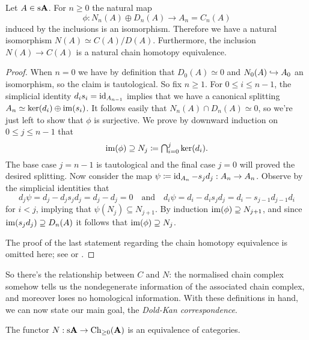 \begin{proposition}
  \label{splitting}
  Let $A \in \mathrm{s}\mathbf{A}$. For $n \ge 0$ the natural map
  \[
  \phi : N_n(A) \oplus D_n(A) \to A_n = C_n(A)
  \]
  induced by the inclusions is an isomorphism. Therefore we have a
  natural isomorphism $N(A) \simeq C(A)/D(A)$. Furthermore, the
  inclusion $N(A) \to C(A)$ is a natural chain homotopy equivalence.
\end{proposition}

\begin{proof}
  When $n=0$ we have by definition that $D_0(A) \simeq 0$ and $N_0(A)
  \hookrightarrow A_0$ an isomorphism, so the claim is tautological. So fix $n
  \ge 1$. For $0 \le i \le n - 1$, the simplicial identity $d_is_i =
  \operatorname{id}_{A_{n-1}}$ implies that we have a canonical splitting $A_n
  \simeq \ker(d_i) \oplus \operatorname{im}(s_i)$. It follows easily that $N_n(A)
  \cap D_n(A) \simeq 0$, so we're just left to show that $\phi$ is
  surjective. We prove by downward induction on $0 \le j \le n-1$ that
  \[
  \textstyle{\operatorname{im}(\phi) \supseteq N_j \coloneqq\bigcap_{i=0}^j
    \ker(d_i).}
  \]
  The base case $j = n-1$ is tautological and the final case $j = 0$
  will proved the desired splitting. Now consider the map $\psi
  \coloneqq \operatorname{id}_{A_n} - s_jd_j : A_n \to A_n$. Observe by the
  simplicial identities that
  \[
  d_j\psi = d_j - d_js_jd_j = d_j - d_j = 0 \quad\text{and}\quad
  d_i\psi = d_i - d_is_jd_j = d_i - s_{j-1}d_{j-1}d_i
  \]
  for $i < j$, implying that $\psi(N_j) \subseteq N_{j+1}$. By
  induction $\operatorname{im}(\phi) \supseteq N_{j+1}$, and since $\operatorname{im}(s_jd_j)
  \supseteq D_n(A)$ it follows that $\operatorname{im}(\phi) \supseteq N_j$.

  The proof of the last statement regarding the chain homotopy
  equivalence is omitted here; see \cite{goerssjardine} or
  \cite{weibel}.
\end{proof}

So there's the relationship between $C$ and $N$: the normalised chain
complex somehow tells us the nondegenerate information of the
associated chain complex, and moreover loses no homological
information. With these definitions in hand, we can now state our main
goal, the \textit{Dold-Kan correspondence}.

\begin{theorem}
  \label{doldkan}
  The functor $N : \mathrm{s}\mathbf{A} \to \mathrm{Ch}_{\ge 0}(\mathbf{A})$ is an equivalence of
  categories.
\end{theorem}


